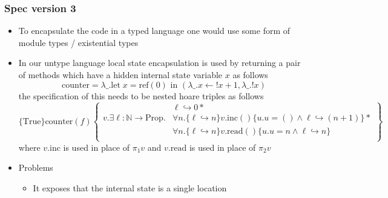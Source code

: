 \subsubsection{Spec version 3}
\begin{itemize}
	\item To encapsulate the code in a typed language one would use some form of module types / existential types
  \item In our untype language local state encapsulation is used by returning a pair of methods which have a hidden internal state variable $x$ as follows
  \begin{equation*}
    \text{counter} = \lambda\_.\text{let} \; x = \text{ref}(0) \text{ in }(\lambda\_.x \leftarrow !x + 1, \lambda \_. !x)
  \end{equation*}
  the specification of this needs to be nested hoare triples as follows 
  \begin{equation*} 
    \{\text{True} \} \text{counter}(f) \left\{
      \begin{split} 
                                                & \ell \hookrightarrow 0 * \\
        v.\exists \ell: \mathbb N \to \text{Prop}. & \forall n. \{\ell \hookrightarrow n\} v.\text{inc}() \{u.u=() \land \ell \hookrightarrow (n+1)\} * \\
                                                & \forall n. \{\ell \hookrightarrow n\} v.\text{read}() \{u.u=n \land \ell \hookrightarrow n\}  \\
      \end{split}
      \right\}
  \end{equation*}
  where $v.\text{inc}$ is used in place of $\pi_1 v$ and $v.\text{read}$ is used in place of $\pi_2 v$ 
  \item Problems
  \begin{itemize}
  	\item It exposes that the internal state is a single location
  \end{itemize}
\end{itemize}
